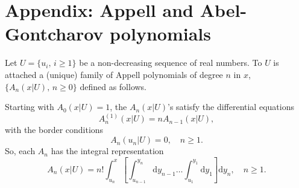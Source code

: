 \section{Appendix: Appell and Abel-Gontcharov polynomials}\label{app:appell_AG_polynomials}
\noindent Let $U=\{u_i, \, i\geq 1\}$ be a non-decreasing sequence of real numbers. To $U$ is attached a (unique) family of Appell polynomials of degree $n$ in $x$, $\{A_{n}(x\vert U),\, n\geq 0\}$ defined as follows.
\begin{definition} 
Starting with $A_0(x\vert U)=1$, the $A_n(x\vert U)$'s satisfy the differential equations
\begin{equation}\label{eq:DifferentialEquationAppellPolynomial}
A_{n}^{(1)}(x|U)=nA_{n-1}(x|U),  
\end{equation}
with the border conditions
\begin{equation}\label{eq:Border AppellPolynomial}
A_{n}(u_{n}|U)=0, \quad n\geq 1.
\end{equation}
So, each $A_n$ has the integral representation
\begin{equation}\label{eq:IntegralRepresentationAppellPolynomials}
A_{n}(x|U)=n!\int_{u_{n}}^{x}\left[\int_{u_{n-1}}^{y_{n}}\text{d}y_{n-1} \ldots \int_{u_{1}}^{y_{1}}\text{d}y_{1}\right]\text{d}y_{n}, \quad n\geq 1.
\end{equation}
\end{definition}

